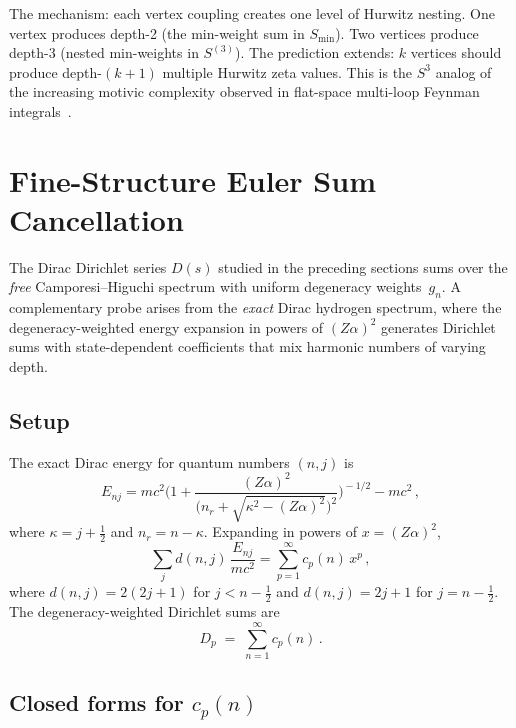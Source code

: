 \documentclass[11pt]{article}
\begin{document}
The mechanism: each vertex coupling creates one level of Hurwitz nesting.
One vertex produces depth-2 (the min-weight sum in $S_{\min}$).
Two vertices produce depth-3 (nested min-weights in $S^{(3)}$).
The prediction extends: $k$ vertices should produce depth-$(k+1)$
multiple Hurwitz zeta values.  This is the $S^3$ analog of the
increasing motivic complexity observed in flat-space multi-loop Feynman
integrals~\cite{laporta2002,bailey2001}.

\section{Fine-Structure Euler Sum Cancellation}
\label{sec:euler_cancel}

The Dirac Dirichlet series $D(s)$ studied in the preceding sections
sums over the \emph{free} Camporesi--Higuchi spectrum with uniform
degeneracy weights~$g_n$.  A complementary probe arises from the
\emph{exact} Dirac hydrogen spectrum, where the degeneracy-weighted
energy expansion in powers of $(Z\alpha)^2$ generates Dirichlet sums
with state-dependent coefficients that mix harmonic numbers of varying
depth.

\subsection{Setup}

The exact Dirac energy for quantum numbers $(n,j)$ is
\begin{equation}
  E_{nj} = mc^2 \biggl(
    1 + \frac{(Z\alpha)^2}
    {\bigl(n_r + \sqrt{\kappa^2 - (Z\alpha)^2}\bigr)^2}
  \biggr)^{\!-1/2} - mc^2\,,
\end{equation}
where $\kappa = j + \frac{1}{2}$ and $n_r = n - \kappa$.
Expanding in powers of $x = (Z\alpha)^2$,
\begin{equation}
  \sum_j d(n,j)\, \frac{E_{nj}}{mc^2}
  = \sum_{p=1}^{\infty} c_p(n)\, x^p\,,
\end{equation}
where $d(n,j) = 2(2j+1)$ for $j < n - \tfrac{1}{2}$ and
$d(n,j) = 2j+1$ for $j = n - \tfrac{1}{2}$.
The degeneracy-weighted Dirichlet sums are
\begin{equation}
  D_p \;=\; \sum_{n=1}^{\infty} c_p(n)\,.
\end{equation}

\subsection{Closed forms for $c_p(n)$}
\end{document}
